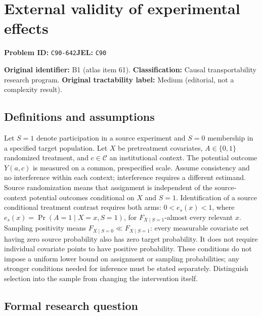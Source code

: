 \documentclass[11pt,a4paper]{article}
\begin{document}
\section*{External validity of experimental effects}
\textbf{Problem ID:} \texttt{C90-642}\quad \textbf{JEL:} \texttt{C90}\par
\label{problem:OP-0061}
\label{atlas:prob:B1}

\noindent\textbf{Original identifier:} B1 (atlas item 61). \textbf{Classification:} Causal transportability research program. \textbf{Original tractability label:} Medium (editorial, not a complexity result).

\subsection*{Definitions and assumptions}

Let $S=1$ denote participation in a source experiment and $S=0$ membership in a specified target population. Let $X$ be pretreatment covariates, $A\in\{0,1\}$ randomized treatment, and $c\in\mathcal C$ an institutional context. The potential outcome $Y(a,c)$ is measured on a common, prespecified scale. Assume consistency and no interference within each context; interference requires a different estimand. Source randomization means that assignment is independent of the source-context potential outcomes conditional on $X$ and $S=1$. Identification of a source conditional treatment contrast requires both arms: $0<e_s(x)<1$, where $e_s(x)=\Pr(A=1\mid X=x,S=1)$, for $F_{X\mid S=1}$-almost every relevant $x$. Sampling positivity means $F_{X\mid S=0}\ll F_{X\mid S=1}$: every measurable covariate set having zero source probability also has zero target probability. It does not require individual covariate points to have positive probability. These conditions do not impose a uniform lower bound on assignment or sampling probabilities; any stronger conditions needed for inference must be stated separately. Distinguish selection into the sample from changing the intervention itself.

\subsection*{Formal research question}
\end{document}
